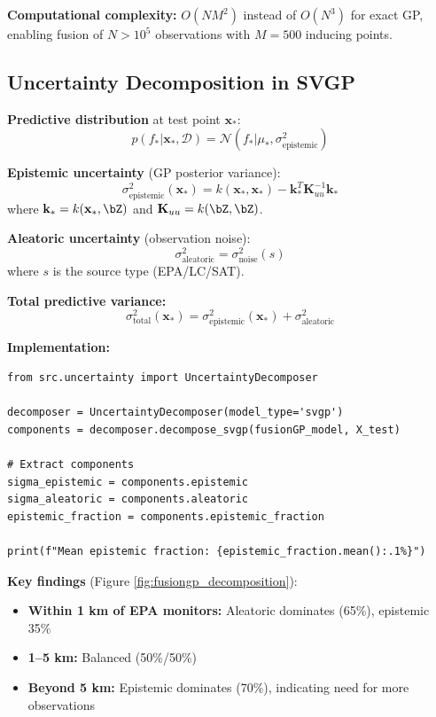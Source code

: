 \documentclass[11pt,letterpaper]{article}
\newcommand{\bx}{\mathbf{x}}
\newcommand{\Normal}{\mathcal{N}}
\begin{document}
\textbf{Computational complexity:} $O(NM^2)$ instead of $O(N^3)$ for exact GP, enabling fusion of $N > 10^5$ observations with $M = 500$ inducing points.

\subsection{Uncertainty Decomposition in SVGP}

\textbf{Predictive distribution} at test point $\bx_*$:
\begin{equation}
p(f_* | \bx_*, \mathcal{D}) = \Normal(f_* | \mu_*, \sigma^2_{\text{epistemic}})
\label{eq:svgp_predictive}
\end{equation}

\textbf{Epistemic uncertainty} (GP posterior variance):
\begin{equation}
\sigma^2_{\text{epistemic}}(\bx_*) = k(\bx_*, \bx_*) - \mathbf{k}_*^T \mathbf{K}_{uu}^{-1} \mathbf{k}_*
\label{eq:epistemic_svgp}
\end{equation}
where $\mathbf{k}_* = k(\bx_*, \bZ)$ and $\mathbf{K}_{uu} = k(\bZ, \bZ)$.

\textbf{Aleatoric uncertainty} (observation noise):
\begin{equation}
\sigma^2_{\text{aleatoric}} = \sigma^2_{\text{noise}}(s)
\label{eq:aleatoric}
\end{equation}
where $s$ is the source type (EPA/LC/SAT).

\textbf{Total predictive variance:}
\begin{equation}
\sigma^2_{\text{total}}(\bx_*) = \sigma^2_{\text{epistemic}}(\bx_*) + \sigma^2_{\text{aleatoric}}
\label{eq:total_variance}
\end{equation}

\textbf{Implementation:}
\begin{lstlisting}[caption=Uncertainty decomposition with FusionGP, label=code:decomposition]
from src.uncertainty import UncertaintyDecomposer

decomposer = UncertaintyDecomposer(model_type='svgp')
components = decomposer.decompose_svgp(fusionGP_model, X_test)

# Extract components
sigma_epistemic = components.epistemic
sigma_aleatoric = components.aleatoric
epistemic_fraction = components.epistemic_fraction

print(f"Mean epistemic fraction: {epistemic_fraction.mean():.1%}")
\end{lstlisting}

\textbf{Key findings} (Figure \ref{fig:fusiongp_decomposition}):
\begin{itemize}
    \item \textbf{Within 1 km of EPA monitors:} Aleatoric dominates (65\%), epistemic 35\%
    \item \textbf{1--5 km:} Balanced (50\%/50\%)
    \item \textbf{Beyond 5 km:} Epistemic dominates (70\%), indicating need for more observations
\end{itemize}
\end{document}
